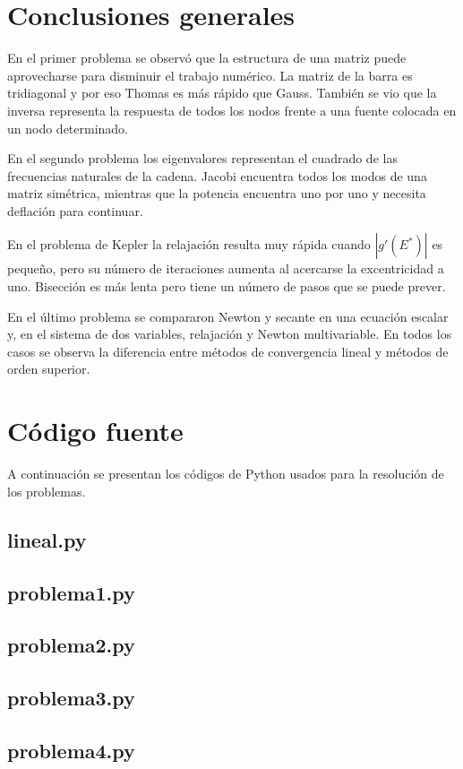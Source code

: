 \documentclass[11pt,a4paper]{article}
\begin{document}
\section{Conclusiones generales}

En el primer problema se observó que la estructura de una matriz puede aprovecharse para disminuir el trabajo numérico. La matriz de la barra es tridiagonal y por eso Thomas es más rápido que Gauss. También se vio que la inversa representa la respuesta de todos los nodos frente a una fuente colocada en un nodo determinado.

En el segundo problema los eigenvalores representan el cuadrado de las frecuencias naturales de la cadena. Jacobi encuentra todos los modos de una matriz simétrica, mientras que la potencia encuentra uno por uno y necesita deflación para continuar.

En el problema de Kepler la relajación resulta muy rápida cuando $|g'(E^*)|$ es pequeño, pero su número de iteraciones aumenta al acercarse la excentricidad a uno. Bisección es más lenta pero tiene un número de pasos que se puede prever.

En el último problema se compararon Newton y secante en una ecuación escalar y, en el sistema de dos variables, relajación y Newton multivariable. En todos los casos se observa la diferencia entre métodos de convergencia lineal y métodos de orden superior.

\newpage
\appendix
\section{Código fuente}

A continuación se presentan los códigos de Python usados para la resolución de los problemas.

\subsection{lineal.py}


\subsection{problema1.py}


\subsection{problema2.py}


\subsection{problema3.py}


\subsection{problema4.py}

\end{document}
